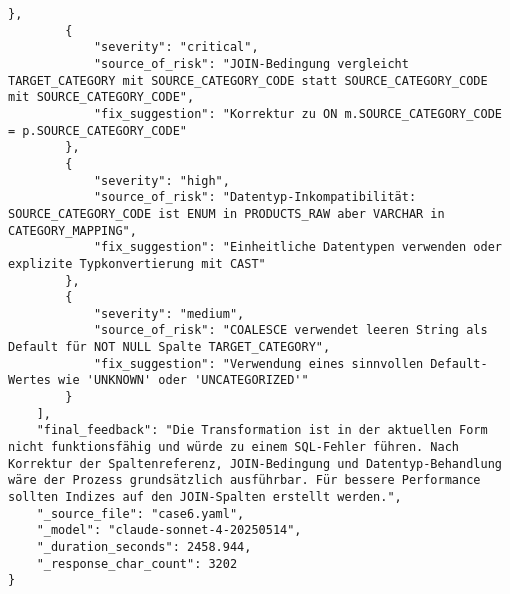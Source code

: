 \begin{lstlisting}[caption={Ausgabe: Claude Sonnet 4 Anwendungsfall 6 Robustheitsdurchlauf},label={claude_case6_prompt3}]
        },
        {
            "severity": "critical",
            "source_of_risk": "JOIN-Bedingung vergleicht TARGET_CATEGORY mit SOURCE_CATEGORY_CODE statt SOURCE_CATEGORY_CODE mit SOURCE_CATEGORY_CODE",
            "fix_suggestion": "Korrektur zu ON m.SOURCE_CATEGORY_CODE = p.SOURCE_CATEGORY_CODE"
        },
        {
            "severity": "high",
            "source_of_risk": "Datentyp-Inkompatibilität: SOURCE_CATEGORY_CODE ist ENUM in PRODUCTS_RAW aber VARCHAR in CATEGORY_MAPPING",
            "fix_suggestion": "Einheitliche Datentypen verwenden oder explizite Typkonvertierung mit CAST"
        },
        {
            "severity": "medium",
            "source_of_risk": "COALESCE verwendet leeren String als Default für NOT NULL Spalte TARGET_CATEGORY",
            "fix_suggestion": "Verwendung eines sinnvollen Default-Wertes wie 'UNKNOWN' oder 'UNCATEGORIZED'"
        }
    ],
    "final_feedback": "Die Transformation ist in der aktuellen Form nicht funktionsfähig und würde zu einem SQL-Fehler führen. Nach Korrektur der Spaltenreferenz, JOIN-Bedingung und Datentyp-Behandlung wäre der Prozess grundsätzlich ausführbar. Für bessere Performance sollten Indizes auf den JOIN-Spalten erstellt werden.",
    "_source_file": "case6.yaml",
    "_model": "claude-sonnet-4-20250514",
    "_duration_seconds": 2458.944,
    "_response_char_count": 3202
}
\end{lstlisting}

